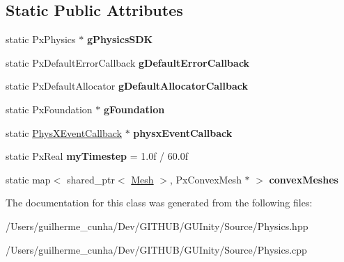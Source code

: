 \subsection*{Static Public Attributes}
\begin{DoxyCompactItemize}
\item 
\hypertarget{class_physics_a2ad3728dd5522f3f424bda60399ccf88}{}static Px\+Physics $\ast$ {\bfseries g\+Physics\+S\+D\+K}\label{class_physics_a2ad3728dd5522f3f424bda60399ccf88}

\item 
\hypertarget{class_physics_a0e40ffb4cbbffabfbb85f074a0425f8c}{}static Px\+Default\+Error\+Callback {\bfseries g\+Default\+Error\+Callback}\label{class_physics_a0e40ffb4cbbffabfbb85f074a0425f8c}

\item 
\hypertarget{class_physics_a19b2ae365f967634785f9d70a532c02f}{}static Px\+Default\+Allocator {\bfseries g\+Default\+Allocator\+Callback}\label{class_physics_a19b2ae365f967634785f9d70a532c02f}

\item 
\hypertarget{class_physics_acfcee285f1920dd0d3efa4a9d6188b9f}{}static Px\+Foundation $\ast$ {\bfseries g\+Foundation}\label{class_physics_acfcee285f1920dd0d3efa4a9d6188b9f}

\item 
\hypertarget{class_physics_a19cc5586e2a87e6984b6c5d044040b83}{}static \hyperlink{class_phys_x_event_callback}{Phys\+X\+Event\+Callback} $\ast$ {\bfseries physx\+Event\+Callback}\label{class_physics_a19cc5586e2a87e6984b6c5d044040b83}

\item 
\hypertarget{class_physics_a2cefc51f88c56b800fc3d1de56223132}{}static Px\+Real {\bfseries my\+Timestep} = 1.\+0f / 60.\+0f\label{class_physics_a2cefc51f88c56b800fc3d1de56223132}

\item 
\hypertarget{class_physics_afaa14c98236618242d15a8e2a15ee88c}{}static map$<$ shared\+\_\+ptr$<$ \hyperlink{class_mesh}{Mesh} $>$, Px\+Convex\+Mesh $\ast$ $>$ {\bfseries convex\+Meshes}\label{class_physics_afaa14c98236618242d15a8e2a15ee88c}

\end{DoxyCompactItemize}


The documentation for this class was generated from the following files\+:\begin{DoxyCompactItemize}
\item 
/\+Users/guilherme\+\_\+cunha/\+Dev/\+G\+I\+T\+H\+U\+B/\+G\+U\+Inity/\+Source/Physics.\+hpp\item 
/\+Users/guilherme\+\_\+cunha/\+Dev/\+G\+I\+T\+H\+U\+B/\+G\+U\+Inity/\+Source/Physics.\+cpp\end{DoxyCompactItemize}
